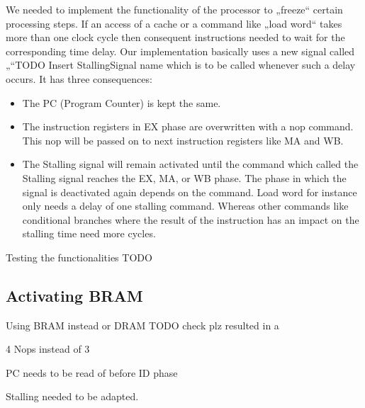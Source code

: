 We needed to implement the functionality of the processor to „freeze“ certain processing steps. If an access of a cache or a command like „load word“ takes more than one clock cycle then consequent instructions needed to wait for the corresponding time delay. 
Our implementation basically uses a new signal called „“TODO Insert StallingSignal name which is to be called whenever such a delay occurs. It has three consequences:
\begin{itemize} 
	\item The PC (Program Counter) is kept the same.
	\item The instruction registers in EX phase are overwritten with a nop command. This nop will be passed on to next instruction registers like MA and WB.
	\item The Stalling signal will remain activated until the command which called the Stalling signal reaches the EX, MA, or WB phase. The phase in which the signal is deactivated again depends on the command. Load word for instance only needs a delay of one stalling command. Whereas other commands like conditional branches where the result of the instruction has an impact on the stalling time need more cycles.
\end{itemize}

Testing the functionalities TODO

\subsection{Activating BRAM}
\label{sec:activatingBRAM}

Using BRAM instead or DRAM  TODO check plz resulted in a  
	
4 Nops instead of 3

PC needs to be read of before ID phase

Stalling needed to be adapted.

